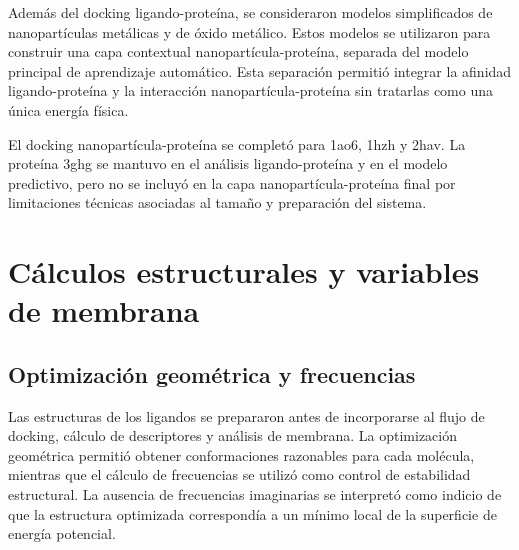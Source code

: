 \documentclass[
  spanish,
  a4paper,
  12pt,
  oneside,
  openany]{memoir}
\newcommand{\apendice}[1]{\chapter{#1}}
\begin{document}
Además del docking ligando-proteína, se consideraron modelos
simplificados de nanopartículas metálicas y de óxido metálico. Estos
modelos se utilizaron para construir una capa contextual
nanopartícula-proteína, separada del modelo principal de aprendizaje
automático. Esta separación permitió integrar la afinidad
ligando-proteína y la interacción nanopartícula-proteína sin tratarlas
como una única energía física.

\begin{table}

\caption{\label{tbl-anexo-nanoparticulas}Modelos de nanopartículas considerados en el trabajo.}


\end{table}%

El docking nanopartícula-proteína se completó para 1ao6, 1hzh y 2hav. La
proteína 3ghg se mantuvo en el análisis ligando-proteína y en el modelo
predictivo, pero no se incluyó en la capa nanopartícula-proteína final
por limitaciones técnicas asociadas al tamaño y preparación del sistema.

\apendice{Cálculos estructurales y variables de membrana}

\section{Optimización geométrica y frecuencias}

Las estructuras de los ligandos se prepararon antes de incorporarse al
flujo de docking, cálculo de descriptores y análisis de membrana. La
optimización geométrica permitió obtener conformaciones razonables para
cada molécula, mientras que el cálculo de frecuencias se utilizó como
control de estabilidad estructural. La ausencia de frecuencias
imaginarias se interpretó como indicio de que la estructura optimizada
correspondía a un mínimo local de la superficie de energía potencial.
\end{document}

